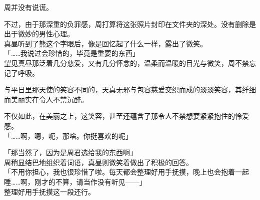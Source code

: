 周并没有说谎。

不过，由于那深重的负罪感，周打算将这张照片封印在文件夹的深处。没有删除是出于微妙的男性心理。\\

真昼听到了熊这个字眼后，像是回忆起了什么一样，露出了微笑。\\

「……我说过会珍惜的，毕竟是重要的东西」\\

望见真昼那泛着几分慈爱，又有几分怀念的，温柔而温暖的目光与微笑，周不禁忘记了呼吸。

与平日里那天使的笑容不同的，天真无邪与包容慈爱交织而成的淡淡笑容，其纤细而美丽实在令人不禁沉醉。

不仅如此，在美丽之上，这笑容，甚至还蕴含了那令人不禁想要紧紧抱住的怜爱感。\\

「……啊，嗯，呃，那啥。你挺喜欢的呢」

「那当然了，因为是周君选给我的东西啊」\\

周稍显结巴地组织着词语，真昼则微笑着做出了积极的回答。\\

「不用你担心，我也很珍惜了啦。每天都会整理好用手抚摸，晚上也会抱着一起睡……啊，刚才的不算，请当作没有听见——」\\

整理好用手抚摸这一段还行。

